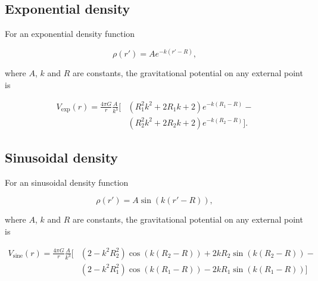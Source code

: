\documentclass[extra, referee]{gji}
\begin{document}
\subsection{Exponential density}

For an exponential density function

\begin{equation}
    \rho(r') = A e^{- k (r' - R)},
\end{equation}

\noindent
where $A$, $k$ and $R$ are constants, the gravitational potential on any external point
is

\begin{equation}
    \begin{split}
    V_\text{exp}(r) = \frac{4\pi G}{r} \frac{A}{k^3} \Big[
    & \left( R_1^2 k^2 + 2 R_1 k + 2 \right) e^{- k (R_1 - R)} - \\
    & \left( R_2^2 k^2 + 2 R_2 k + 2 \right) e^{- k (R_2 - R)}
    \Big].
    \end{split}
\end{equation}


\subsection{Sinusoidal density}

For an sinusoidal density function

\begin{equation}
    \rho(r') = A \sin ( k (r' - R)),
\end{equation}

\noindent
where $A$, $k$ and $R$ are constants, the gravitational potential on any external point
is

\begin{equation}
    \begin{split}
    V_\text{sine}(r) = \frac{4\pi G}{r} \frac{A}{k^3} \Big[
    & (2 - k^2 R_2^2) \cos(k(R_2 - R)) + 2 k R_2 \sin(k(R_2 - R)) - \\
    & (2 - k^2 R_1^2) \cos(k(R_1 - R)) - 2 k R_1 \sin(k(R_1 - R))
        \Big]
    \end{split}
\end{equation}
\end{document}

